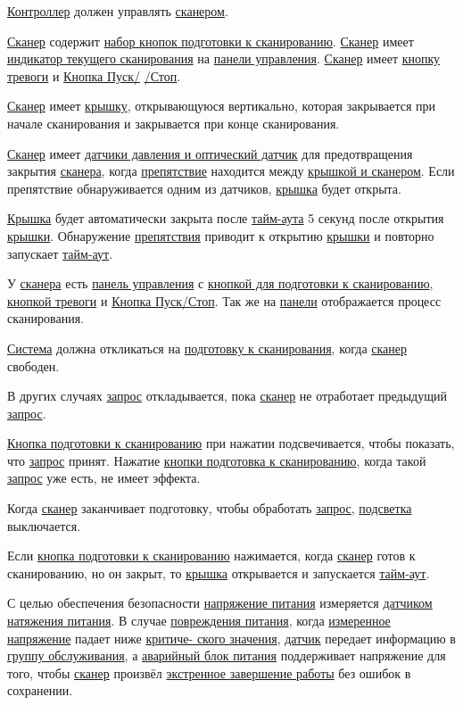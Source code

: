 \documentclass[12pt]{article}
\begin{document}
    \uline{Контроллер} должен управлять \uline{сканером}.

    \uline{Сканер} содержит \uline{набор кнопок подготовки к сканированию}. \uline{Сканер} имеет \uline{индикатор текущего сканирования} на \uline{панели управления}. \uline{Сканер} имеет \uline{кнопку тревоги} и \uline{Кнопка Пуск/} \uline{/Стоп}.

    \uline{Сканер} имеет \uline{крышку}, открывающуюся вертикально, которая закрывается при начале сканирования и закрывается при конце  сканирования.

    \uline{Сканер} имеет \uline{датчики давления и оптический датчик} для предотвращения закрытия \uline{сканера}, когда \uline{препятствие} находится между \uline{крышкой и сканером}. Если препятствие обнаруживается одним из датчиков, \uline{крышка} будет открыта.

    \uline{Крышка} будет автоматически закрыта после \uline{тайм-аута} 5 секунд после открытия \uline{крышки}. Обнаружение \uline{препятствия} приводит к открытию \uline{крышки} и повторно запускает \uline{тайм-аут}.

    У \uline{сканера} есть \uline{панель управления} с \uline{кнопкой для подготовки к сканированию},  \uline{кнопкой тревоги} и \uline{Кнопка Пуск/Стоп}. Так же на \uline{панели} отображается процесс сканирования.

    \uline{Система} должна откликаться на \uline{подготовку к сканирования}, когда \uline{сканер} свободен.

    В других случаях \uline{запрос} откладывается, пока \uline{сканер} не отработает предыдущий \uline{запрос}.

    \uline{Кнопка подготовки к сканированию} при нажатии подсвечивается, чтобы показать, что \uline{запрос} принят. Нажатие \uline{кнопки подготовка к сканированию}, когда такой \uline{запрос} уже есть, не имеет эффекта.

    Когда \uline{сканер} заканчивает подготовку, чтобы обработать \uline{запрос}, \uline{подсветка} выключается.

    Если \uline{кнопка подготовки к сканированию} нажимается, когда \uline{сканер} готов к сканированию, но он закрыт, то \uline{крышка} открывается и запускается \uline{тайм-аут}.

    С целью обеспечения безопасности \uline{напряжение питания} измеряется \uline{датчиком натяжения питания}. В случае \uline{повреждения питания}, когда \uline{измеренное напряжение} падает ниже \uline{критиче- ского значения}, \uline{датчик} передает информацию в \uline{группу обслуживания}, а \uline{аварийный блок питания} поддерживает напряжение для того, чтобы \uline{сканер} произвёл \uline{экстренное завершение работы} без ошибок в сохранении.
\end{document}
